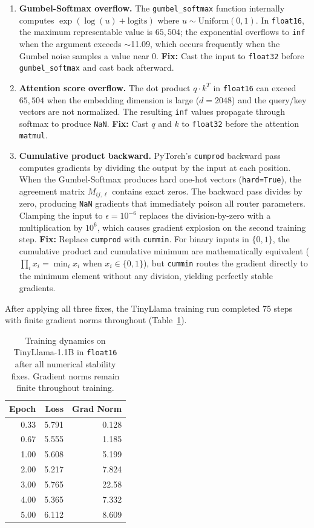 \documentclass[11pt,a4paper]{article}
\begin{document}
\begin{enumerate}
    \item \textbf{Gumbel-Softmax overflow.} The \texttt{gumbel\_softmax} function internally computes $\exp(\log(u) + \text{logits})$ where $u \sim \text{Uniform}(0,1)$. In \texttt{float16}, the maximum representable value is $65{,}504$; the exponential overflows to \texttt{inf} when the argument exceeds $\sim$11.09, which occurs frequently when the Gumbel noise samples a value near $0$. \textbf{Fix:} Cast the input to \texttt{float32} before \texttt{gumbel\_softmax} and cast back afterward.

    \item \textbf{Attention score overflow.} The dot product $q \cdot k^T$ in \texttt{float16} can exceed $65{,}504$ when the embedding dimension is large ($d = 2048$) and the query/key vectors are not normalized. The resulting \texttt{inf} values propagate through softmax to produce \texttt{NaN}. \textbf{Fix:} Cast $q$ and $k$ to \texttt{float32} before the attention \texttt{matmul}.

    \item \textbf{Cumulative product backward.} PyTorch's \texttt{cumprod} backward pass computes gradients by dividing the output by the input at each position. When the Gumbel-Softmax produces hard one-hot vectors (\texttt{hard=True}), the agreement matrix $M_{ij,\ell}$ contains exact zeros. The backward pass divides by zero, producing \texttt{NaN} gradients that immediately poison all router parameters. Clamping the input to $\epsilon = 10^{-6}$ replaces the division-by-zero with a multiplication by $10^{6}$, which causes gradient explosion on the second training step. \textbf{Fix:} Replace \texttt{cumprod} with \texttt{cummin}. For binary inputs in $\{0, 1\}$, the cumulative product and cumulative minimum are mathematically equivalent ($\prod_i x_i = \min_i x_i$ when $x_i \in \{0,1\}$), but \texttt{cummin} routes the gradient directly to the minimum element without any division, yielding perfectly stable gradients.
\end{enumerate}

After applying all three fixes, the TinyLlama training run completed 75 steps with finite gradient norms throughout (Table~\ref{tab:fp16_training}).

\begin{table}[h]
\centering
\caption{Training dynamics on TinyLlama-1.1B in \texttt{float16} after all numerical stability fixes. Gradient norms remain finite throughout training.}
\label{tab:fp16_training}
\begin{tabular}{@{}rrr@{}}
\toprule
Epoch & Loss & Grad Norm \\
\midrule
0.33 & 5.791 & 0.128 \\
0.67 & 5.555 & 1.185 \\
1.00 & 5.608 & 5.199 \\
2.00 & 5.217 & 7.824 \\
3.00 & 5.765 & 22.58 \\
4.00 & 5.365 & 7.332 \\
5.00 & 6.112 & 8.609 \\
\bottomrule
\end{tabular}
\end{table}
\end{document}
